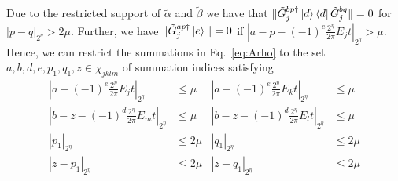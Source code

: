 \documentclass[aps,floatfix,10pt,amssymb,amsfont,amsmath,superscriptaddress,float,nofootinbib,longbibliography,nobalancelastpage,twocolumn]{revtex4-2}
\begin{document}
Due to the restricted support of $\tilde \alpha$ and $\tilde \beta$ we have that $\|\tilde G^{bp\dagger}_{j}\ket{d}\bra{d}\tilde G^{bq}_{j}\| = 0$ for $|p-q|_{2^{\eta}} > 2\mu$. Further, we have $\|\tilde G^{ap \dagger}_j \ket{e}\| = 0$ if $|a-p-(-1)^e\frac{2^{\eta}}{2\pi}E_{j}t|_{2^{\eta}} > \mu$. Hence, we can restrict the summations in Eq.~\eqref{eq:Arho}  to the set $a,b,d,e,p_1,q_1,z \in \chi_{jklm}$ of summation indices satisfying
\begin{equation}
\begin{aligned}
    |a-(-1)^e\frac{2^{\eta}}{2\pi}E_jt|_{2^{\eta}} &\leq \mu  &|a-(-1)^e\frac{2^{\eta}}{2\pi}E_kt|_{2^{\eta}} &\leq \mu\\
       |b-z-(-1)^{d}\frac{2^{\eta}}{2\pi}E_mt|_{2^{\eta}}& \leq \mu&|b-z-(-1)^{d}\frac{2^{\eta}}{2\pi}E_lt|_{2^{\eta}} &\leq \mu \\
    |p_1|_{2^{\eta}}&\leq 2\mu&  |q_1|_{2^{\eta}}&\leq 2\mu \\
    |z-p_1|_{2^{\eta}}&\leq 2\mu&  |z-q_1|_{2^{\eta}}&\leq 2\mu \\
\end{aligned}
\end{equation}
\end{document}
